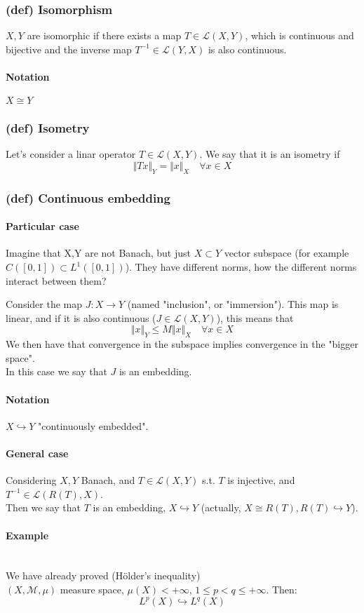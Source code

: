 \subsubsection{(def) Isomorphism}
$X,Y$ are isomorphic if there exists a map $T\in \mathcal L(X,Y)$, which is continuous and bijective and the inverse map $T^{-1}\in \mathcal L(Y,X)$ is also continuous.
\paragraph{Notation} $X\cong Y$
\subsubsection{(def) Isometry}
Let's consider a linar operator $T\in \mathcal L(X,Y)$. We say that it is an isometry if $$\Vert Tx\Vert _Y=\Vert x\Vert_X \quad \forall x\in X$$
\subsubsection{(def) Continuous embedding}
\paragraph{Particular case}
Imagine that X,Y are not Banach, but just $X\subset Y$ vector subspace (for example $C([0,1])\subset L^1([0,1])$). They have different norms, how the different norms interact between them? 

Consider the map $J:X\to Y$ (named "inclusion", or "immersion"). This map is linear, and if it is also continuous ($J\in \mathcal L(X,Y)$), this means that $$\Vert x\Vert_Y\leq M\Vert x\Vert_X\quad \forall x\in X$$
We then have that convergence in the subspace implies convergence in the "bigger space".\\
In this case we say that $J$ is an embedding.
\paragraph{Notation} $X\hookrightarrow Y$ "continuously embedded".
\paragraph{General case}
Considering $X,Y$ Banach, and $T\in \mathcal L(X,Y)$ s.t. $T$ is injective,
and $T^{-1}\in \mathcal L(R(T),X)$.\\
Then we say that $T$ is an embedding, $X\hookrightarrow Y$ (actually, $X\cong R(T), R(T)\hookrightarrow Y$). 
\paragraph{Example}\ \\
We have already proved (Hölder's inequality)\\
$(X,\mathcal M,\mu)$ measure space, $\mu(X)<+\infty$, $1\leq p<q\leq +\infty$. Then:
$$L^p(X)\hookrightarrow L^q(X)$$
